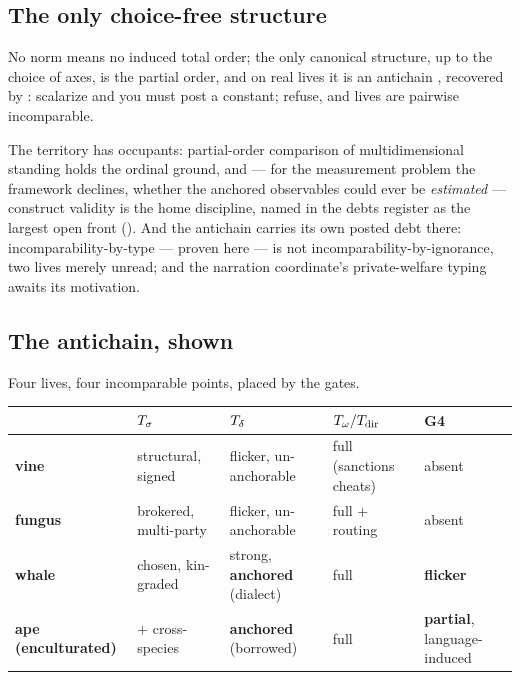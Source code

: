 \documentclass[../main]{subfiles}
\begin{document}
\subsection{The only choice-free structure}
\label{subsec:prof:order}
%
\begin{proposition}
  No norm means no induced total order; the only canonical structure, up to the choice of
  axes, is the partial order, and on real lives it is an antichain , recovered
  by : scalarize and you must post a constant; refuse, and lives are pairwise
  incomparable.
\end{proposition}

The territory has occupants: partial-order comparison of multidimensional standing
\parencite{a:multidim} holds the ordinal ground, and --- for the measurement problem the
framework declines, whether the anchored observables could ever be \emph{estimated} ---
construct validity \parencite{a:constructvalidity} is the home discipline, named in the
debts register as the largest open front (). And the antichain carries
its own posted debt there: incomparability-by-type --- proven here --- is not
incomparability-by-ignorance, two lives merely unread; and the narration coordinate's
private-welfare typing awaits its motivation.

\subsection{The antichain, shown}
\label{subsec:prof:antichain}
%
Four lives, four incomparable points, placed by the gates.

\begin{table}[htbp]
  \centering
  \begin{tabularx}{\textwidth}{@{} l L L L L @{}}
    \toprule
    & $T\sb{\sigma}$ & $T\sb{\delta}$ & $T\sb{\omega}/T\sb{\mathrm{dir}}$ & G4 \\
    \midrule
    \textbf{vine} & structural, signed & flicker, un-anchorable
      & full (sanctions cheats) & absent \\
    \addlinespace
    \textbf{fungus} & brokered, multi-party & flicker, un-anchorable
      & full $+$ routing & absent \\
    \addlinespace
    \textbf{whale} & chosen, kin-graded & strong, \textbf{anchored} (dialect)
      & full & \textbf{flicker} \\
    \addlinespace
    \textbf{ape (enculturated)} & $+$ cross-species & \textbf{anchored} (borrowed)
      & full & \textbf{partial}, language-induced \\
    \bottomrule
  \end{tabularx}
\end{table}
\end{document}
